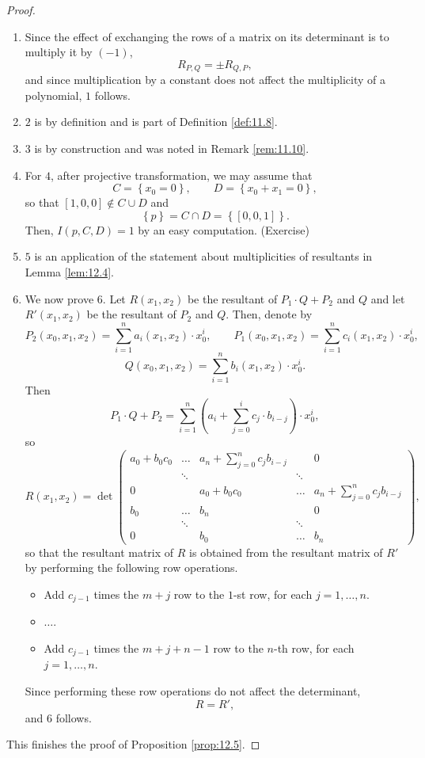 \documentclass{article}
\newcommand{\rb}[1]{\left( #1 \right)}
\renewcommand{\sb}[1]{\left[ #1 \right]}
\newcommand{\cb}[1]{\left\{ #1 \right\}}
\theoremstyle{definition}\newtheorem{definition}{Definition}[section]
\theoremstyle{definition}\newtheorem{notation}[definition]{Notation}
\theoremstyle{definition}\newtheorem{remark}[definition]{Remark}
\theoremstyle{definition}\newtheorem{example1}[definition]{Example}
\theoremstyle{definition}\newtheorem{fact}{Fact}
\theoremstyle{definition}\newtheorem{exercise}{Exercise}
\theoremstyle{definition}\newtheorem*{example2}{Example}
\begin{document}
\begin{proof}
\hfill
\begin{enumerate}
\item Since the effect of exchanging the rows of a matrix on its determinant is to multiply it by $ \rb{-1} $,
$$ R_{P, Q} = \pm R_{Q, P}, $$
and since multiplication by a constant does not affect the multiplicity of a polynomial, $ 1 $ follows.
\item $ 2 $ is by definition and is part of Definition \ref{def:11.8}.
\item $ 3 $ is by construction and was noted in Remark \ref{rem:11.10}.
\item For $ 4 $, after projective transformation, we may assume that
$$ C = \cb{x_0 = 0}, \qquad D = \cb{x_0 + x_1 = 0}, $$
so that $ \sb{1, 0, 0} \notin C \cup D $ and
$$ \cb{p} = C \cap D = \cb{\sb{0, 0, 1}}. $$
Then, $ I\rb{p, C, D} = 1 $ by an easy computation. (Exercise)
\item $ 5 $ is an application of the statement about multiplicities of resultants in Lemma \ref{lem:12.4}.
\item We now prove $ 6 $. Let $ R\rb{x_1, x_2} $ be the resultant of $ P_1 \cdot Q + P_2 $ and $ Q $ and let $ R'\rb{x_1, x_2} $ be the resultant of $ P_2 $ and $ Q $. Then, denote by
$$ P_2\rb{x_0, x_1, x_2} = \sum_{i = 1}^n a_i\rb{x_1, x_2} \cdot x_0^i, \qquad P_1\rb{x_0, x_1, x_2} = \sum_{i = 1}^n c_i\rb{x_1, x_2} \cdot x_0^i, $$
$$ Q\rb{x_0, x_1, x_2} = \sum_{i = 1}^n b_i\rb{x_1, x_2} \cdot x_0^i. $$
Then
$$ P_1 \cdot Q + P_2 = \sum_{i = 1}^n \rb{a_i + \sum_{j = 0}^i c_j \cdot b_{i - j}} \cdot x_0^i, $$
so
$$ R\rb{x_1, x_2} = \det\begin{pmatrix}
a_0 + b_0c_0 & \dots & a_n + \sum_{j = 0}^n c_jb_{i - j} & & 0 \\
& \ddots & & \ddots & \\
0 & & a_0 + b_0c_0 & \dots & a_n + \sum_{j = 0}^n c_jb_{i - j} \\
b_0 & \dots & b_n & & 0 \\
& \ddots & & \ddots & \\
0 & & b_0 & \dots & b_n \end{pmatrix}, $$
so that the resultant matrix of $ R $ is obtained from the resultant matrix of $ R' $ by performing the following row operations.
\begin{itemize}
\item Add $ c_{j - 1} $ times the $ m + j $ row to the $ 1 $-st row, for each $ j = 1, \dots, n $.
\item $ \dots $.
\item Add $ c_{j - 1} $ times the $ m + j + n - 1 $ row to the $ n $-th row, for each $ j = 1, \dots, n $.
\end{itemize}
Since performing these row operations do not affect the determinant,
$$ R = R', $$
and $ 6 $ follows.
\end{enumerate}
This finishes the proof of Proposition \ref{prop:12.5}.
\end{proof}
\end{document}
